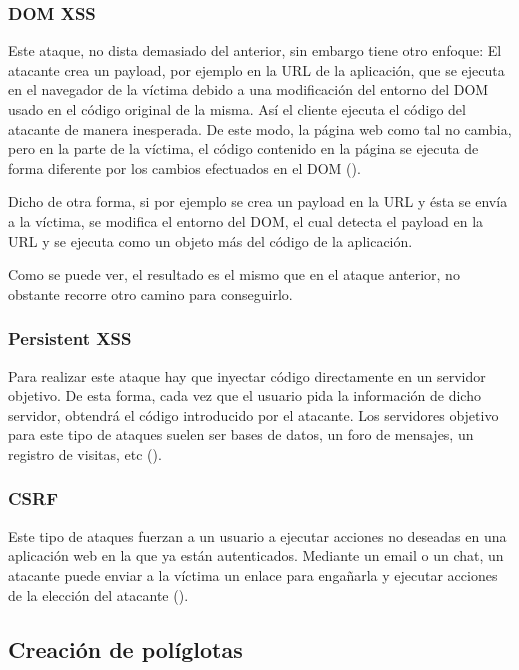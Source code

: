 \subsubsection{DOM XSS}

Este ataque, no dista demasiado del anterior, sin embargo tiene otro enfoque: El atacante crea un payload, por ejemplo en la URL de la aplicación, que se ejecuta en el navegador de la víctima debido a una modificación del entorno del DOM usado en el código original de la misma. Así el cliente ejecuta el código del atacante de manera inesperada. De este modo, la página web como tal no cambia, pero en la parte de la víctima, el código contenido en la página se ejecuta de forma diferente por los cambios efectuados en el DOM (\cite{dom-xss}).

Dicho de otra forma, si por ejemplo se crea un payload en la URL y ésta se envía a la víctima, se modifica el entorno del DOM, el cual detecta el payload en la URL y se ejecuta como un objeto más del código de la aplicación.

Como se puede ver, el resultado es el mismo que en el ataque anterior, no obstante recorre otro camino para conseguirlo. %

\subsubsection{Persistent XSS}

Para realizar este ataque hay que inyectar código directamente en un servidor objetivo. De esta forma, cada vez que el usuario pida la información de dicho servidor, obtendrá el código introducido por el atacante. Los servidores objetivo para este tipo de ataques suelen ser bases de datos, un foro de mensajes, un registro de visitas, etc (\cite{persistent-xss}). %

\subsubsection{CSRF}

Este tipo de ataques fuerzan a un usuario a ejecutar acciones no deseadas en una aplicación web en la que ya están autenticados. Mediante un email o un chat, un atacante puede enviar a la víctima un enlace para engañarla y ejecutar acciones de la elección del atacante (\cite{csrf}). %

\subsection{Creación de políglotas}

